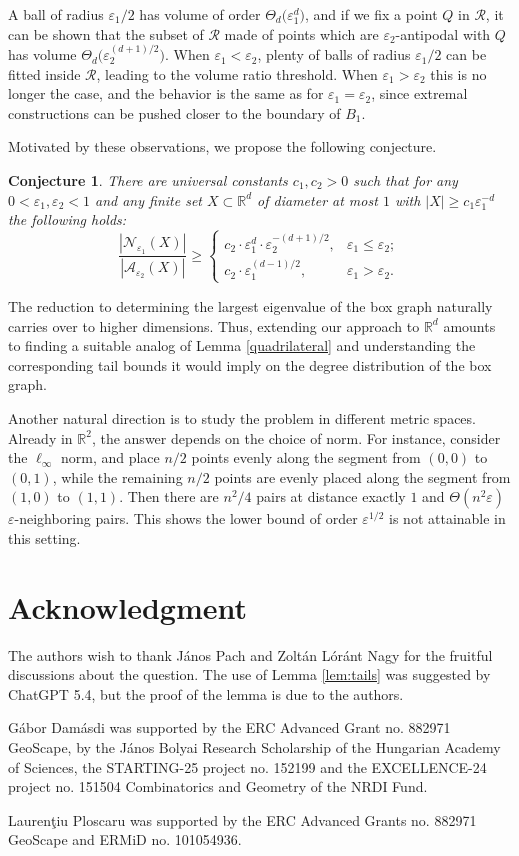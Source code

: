 \documentclass[12pt]{article}
\newtheorem{conjecture}[thm]{Conjecture}
\newcommand{\eps}{\varepsilon}
\begin{document}
A ball of radius $\eps_1/2$ has volume of order $\Theta_d\big(\eps_1^d\big)$, and if we fix a point $Q$ in $\mathcal{R}$, it can be shown that the subset of $\mathcal{R}$ made of points which are $\eps_2$-antipodal with $Q$ has volume $\Theta_d\big(\eps_2^{(d+1)/2}\big)$. When $\eps_1<\eps_2$, plenty of balls of radius $\eps_1/2$ can be fitted inside $\mathcal{R}$, leading to the volume ratio threshold. When $\eps_1>\eps_2$ this is no longer the case, and the behavior is the same as for $\eps_1=\eps_2$, since extremal constructions can be pushed closer to the boundary of $B_1$. 

Motivated by these observations, we propose the following conjecture.

\begin{conjecture}
    There are universal constants $c_1,c_2>0$ such that for any $0<\varepsilon_1,\varepsilon_2<1$ and any finite set $X\subset \mathbb{R}^d$ of diameter at most $1$ with $|X|\ge c_1\varepsilon_1^{-d}$ the following holds: 
\[
\dfrac{|\mathcal{N}_{\eps_1}(X)|}{|\mathcal{A}_{\eps_2}(X)|} \ge
\begin{cases}
c_2\cdot \eps_1^d\cdot \eps_2^{-(d+1)/2}, & \eps_1 \le \eps_2; \\
 c_2\cdot \eps_1^{(d-1)/2}, & \eps_1 > \eps_2.
\end{cases}
\]
\end{conjecture}

The reduction to determining the largest eigenvalue of the box graph naturally carries over to higher dimensions. Thus, extending our approach to $\mathbb{R}^d$ amounts to finding a suitable analog of Lemma \ref{quadrilateral} and understanding the corresponding tail bounds it would imply on the degree distribution of the box graph.

Another natural direction is to study the problem in different metric spaces. Already in $\mathbb{R}^2$, the answer depends on the choice of norm. 
For instance, consider the $\ell_\infty$ norm, and place $n/2$ points evenly along the segment from $(0,0)$ to $(0,1)$, while the remaining $n/2$ points are evenly placed along the segment from $(1,0)$ to $(1,1)$. Then there are $n^2/4$ pairs at distance exactly $1$ and $\Theta(n^2 \varepsilon)$ $\varepsilon$-neighboring pairs. This shows the lower bound of order $\varepsilon^{1/2}$ is not attainable in this setting.


\section*{Acknowledgment}
The authors wish to thank J\'anos Pach and Zolt\'an L\'or\'ant Nagy for the fruitful discussions about the question. The use of Lemma \ref{lem:tails} was suggested by ChatGPT 5.4, but the proof of the lemma is due to the authors.  

G\'abor Dam\'asdi was supported by the ERC Advanced Grant no. 882971 GeoScape, by the J\'anos Bolyai Research Scholarship of the Hungarian Academy of Sciences, the STARTING-25 project no. 152199 and the EXCELLENCE-24 project no. 151504 Combinatorics and Geometry of the NRDI Fund.

Lauren\c{t}iu Ploscaru was supported by the ERC Advanced Grants no. 882971 GeoScape and ERMiD no. 101054936.

\printbibliography
\end{document}
